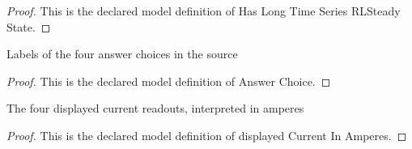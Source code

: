 \begin{proof}
  This is the declared model definition of Has Long Time Series RLSteady State.
\end{proof}
\begin{definition}
  \label{def:physics:phyx-mini-0882:phyxminiproblems-problemphyxmini0882-answerchoice}
  Labels of the four answer choices in the source
\end{definition}
\begin{proof}
  This is the declared model definition of Answer Choice.
\end{proof}
\begin{definition}
  \label{def:physics:phyx-mini-0882:phyxminiproblems-problemphyxmini0882-displayedcurrentinamperes}
  The four displayed current readouts, interpreted in amperes
\end{definition}
\begin{proof}
  This is the declared model definition of displayed Current In Amperes.
\end{proof}
